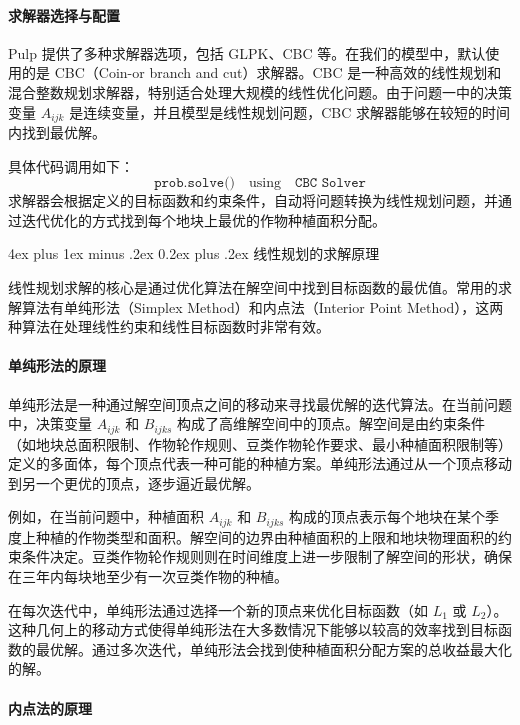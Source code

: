 \documentclass[12pt,a4paper]{nmmcm}
\makeatletter
\renewcommand\subsubsection{\@startsection{subsubsection}{3}{1em}%
  {4ex plus 1ex minus .2ex}%
  {0.2ex plus .2ex}%
  {\normalfont\large\bfseries}}
\makeatother
\begin{document}
\paragraph{求解器选择与配置}

Pulp 提供了多种求解器选项，包括 GLPK、CBC 等。在我们的模型中，默认使用的是 CBC（Coin-or branch and cut）求解器。CBC 是一种高效的线性规划和混合整数规划求解器，特别适合处理大规模的线性优化问题。由于问题一中的决策变量 $A_{ijk}$ 是连续变量，并且模型是线性规划问题，CBC 求解器能够在较短的时间内找到最优解。

具体代码调用如下：
\[
  \texttt{prob.solve()} \quad \text{using} \quad \texttt{CBC Solver}
\]
求解器会根据定义的目标函数和约束条件，自动将问题转换为线性规划问题，并通过迭代优化的方式找到每个地块上最优的作物种植面积分配。

\subsubsection{线性规划的求解原理}

线性规划求解的核心是通过优化算法在解空间中找到目标函数的最优值。常用的求解算法有单纯形法（Simplex Method）和内点法（Interior Point Method），这两种算法在处理线性约束和线性目标函数时非常有效。

\paragraph{单纯形法的原理}

单纯形法是一种通过解空间顶点之间的移动来寻找最优解的迭代算法。在当前问题中，决策变量 $A_{ijk}$ 和 $B_{ijks}$ 构成了高维解空间中的顶点。解空间是由约束条件（如地块总面积限制、作物轮作规则、豆类作物轮作要求、最小种植面积限制等）定义的多面体，每个顶点代表一种可能的种植方案。单纯形法通过从一个顶点移动到另一个更优的顶点，逐步逼近最优解。

例如，在当前问题中，种植面积 $A_{ijk}$ 和 $B_{ijks}$ 构成的顶点表示每个地块在某个季度上种植的作物类型和面积。解空间的边界由种植面积的上限和地块物理面积的约束条件决定。豆类作物轮作规则则在时间维度上进一步限制了解空间的形状，确保在三年内每块地至少有一次豆类作物的种植。

在每次迭代中，单纯形法通过选择一个新的顶点来优化目标函数（如 $L_1$ 或 $L_2$）。这种几何上的移动方式使得单纯形法在大多数情况下能够以较高的效率找到目标函数的最优解。通过多次迭代，单纯形法会找到使种植面积分配方案的总收益最大化的解。

\paragraph{内点法的原理}
\end{document}
